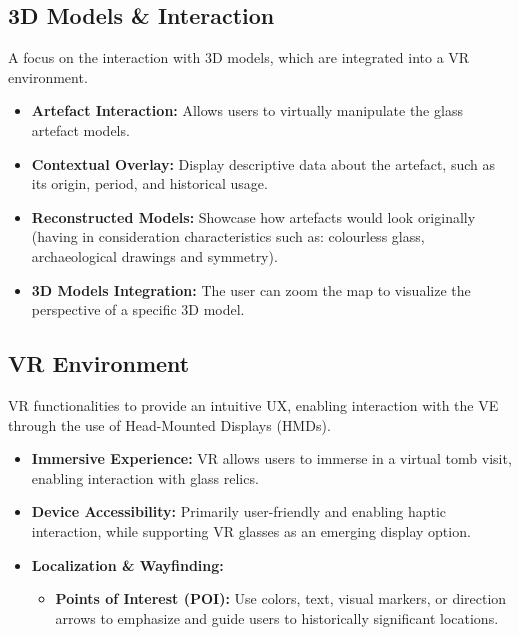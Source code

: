 \subsection*{\gls{3D} Models \& Interaction}
A focus on the interaction with \gls{3D} models, which are integrated into a \gls{VR} environment.
\begin{itemize}
    \item \textbf{Artefact Interaction:} Allows users to virtually manipulate the glass artefact models.
    \item \textbf{Contextual Overlay:} Display descriptive data about the artefact, such as its origin, period, and historical usage.
    \item \textbf{Reconstructed Models:} Showcase how artefacts would look originally (having in consideration characteristics such as: colourless glass, archaeological drawings and symmetry). 
    \item \textbf{3D Models Integration:} The user can zoom the map to visualize the perspective of a specific \gls{3D} model.
\end{itemize}

\subsection*{\gls{VR} Environment}
\gls{VR} functionalities to provide an intuitive \gls{UX}, enabling interaction with the \gls{VE} through the use of Head-Mounted Displays (\glspl{HMD}).
\begin{itemize}
    \item \textbf{Immersive Experience:} \gls{VR} allows users to immerse in a virtual tomb visit, enabling interaction with glass relics.
    \item \textbf{Device Accessibility:} Primarily user-friendly and enabling haptic interaction, while supporting \gls{VR} glasses as an emerging display option.
    \item \textbf{Localization \& Wayfinding:} 
    \begin{itemize}
        \item \textbf{Points of Interest (\gls{POI}):} Use colors, text, visual markers, or direction arrows to emphasize and guide users to historically significant locations.
    \end{itemize}
\end{itemize}

